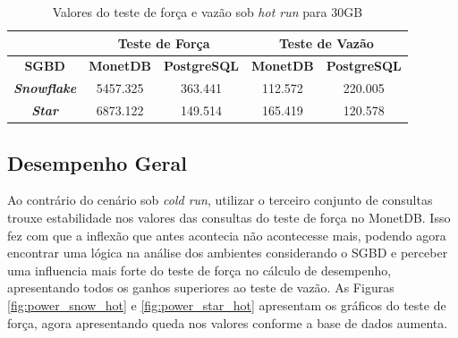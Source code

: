 \begin{table}[htpb]
        \centering
        \caption{Valores do teste de força e vazão sob \textit{hot run} para 30GB}
        \label{tab:forca_vazao_hot_30}
        \begin{tabular}{|c|c|c|c|c|} 
                \cline{2-5}
                \multicolumn{1}{c|}{}         & \multicolumn{2}{c|}{\textbf{Teste de Força} } & \multicolumn{2}{c|}{\textbf{Teste de Vazão} }  \\ 
                \hline
                        \textbf{SGBD}                & \textbf{MonetDB}  & \textbf{PostgreSQL}       & \textbf{MonetDB}  & \textbf{PostgreSQL}        \\ 
                \hline
                        \textit{\textbf{Snowflake}}  & 5457.325          & 363.441                   & 112.572           & 220.005                    \\ 
                \hline
                        \textit{\textbf{Star}}       & 6873.122          & 149.514                   & 165.419           & 120.578                    \\
                \hline
                \end{tabular}
                \end{table}
\subsection{Desempenho Geral}

Ao contrário do cenário sob \textit{cold run}, utilizar o terceiro conjunto de consultas trouxe estabilidade nos valores das consultas do teste de força no MonetDB. Isso fez com que a inflexão que antes acontecia não acontecesse mais, podendo agora encontrar uma lógica na análise dos ambientes considerando o SGBD e perceber uma influencia mais forte do teste de força no cálculo de desempenho, apresentando todos os ganhos superiores ao teste de vazão. As Figuras \ref{fig:power_snow_hot} e \ref{fig:power_star_hot} apresentam os gráficos do teste de força, agora apresentando queda nos valores conforme a base de dados aumenta.

